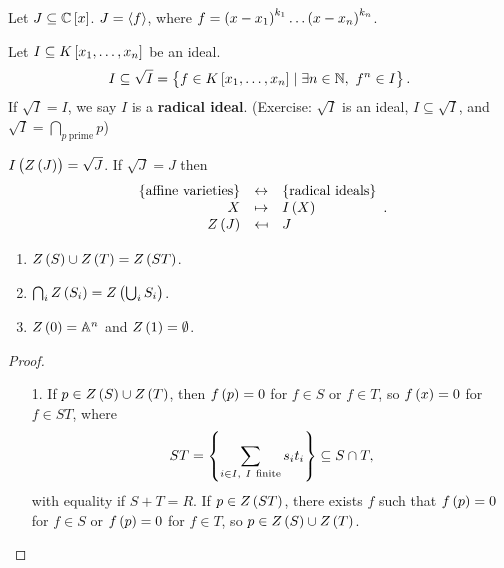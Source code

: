 \pagebreak

\begin{example}
Let $ J \subseteq \C\sbr{x} $. $ J = \left\langle f \right\rangle $, where $ f = \br{x - x_1}^{k_1} \dots \br{x - x_n}^{k_n} $.
\end{example}

\begin{definition}
Let $ I \subseteq K\sbr{x_1, \dots, x_n} $ be an ideal.
$$ I \subseteq \sqrt{I} = \cbr{f \in K\sbr{x_1, \dots, x_n} \mid \exists n \in \N, \ f^n \in I}. $$
If $ \sqrt{I} = I $, we say $ I $ is a \textbf{radical ideal}. (Exercise: $ \sqrt{I} $ is an ideal, $ I \subseteq \sqrt{I} $, and $ \sqrt{I} = \bigcap_{p \ \text{prime}} p $)
\end{definition}

\begin{theorem}
$ I\br{Z\br{J}} = \sqrt{J} $. If $ \sqrt{J} = J $ then
$$
\begin{array}{rcl}
\cbr{\text{affine varieties}} & \leftrightarrow & \cbr{\text{radical ideals}} \\
X & \mapsto & I\br{X} \\
Z\br{J} & \mapsfrom & J
\end{array}.
$$
\end{theorem}


\begin{proposition}
\hfill
\begin{enumerate}
\item $ Z\br{S} \cup Z\br{T} = Z\br{ST} $.
\item $ \bigcap_i Z\br{S_i} = Z\br{\bigcup_i S_i} $.
\item $ Z\br{0} = \A^n $ and $ Z\br{1} = \emptyset $.
\end{enumerate}
\end{proposition}

\begin{proof}
\hfill
\begin{itemize}
\item[1.] If $ p \in Z\br{S} \cup Z\br{T} $, then $ f\br{p} = 0 $ for $ f \in S $ or $ f \in T $, so $ f\br{x} = 0 $ for $ f \in ST $, where
$$ ST = \cbr{\sum_{i \in I, \ I \ \text{finite}} s_it_i} \subseteq S \cap T, $$
with equality if $ S + T = R $. If $ p \in Z\br{ST} $, there exists $ f $ such that $ f\br{p} = 0 $ for $ f \in S $ or $ f\br{p} = 0 $ for $ f \in T $, so $ p \in Z\br{S} \cup Z\br{T} $.
\end{itemize}
\end{proof}

